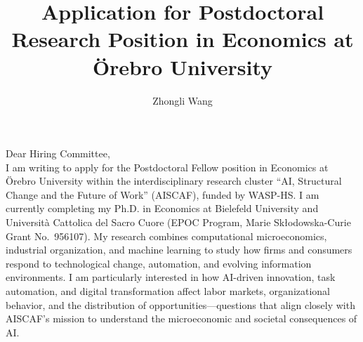 \documentclass{nfr}
\title{Application for Postdoctoral Research Position in Economics at Örebro University}
\author{Zhongli Wang}
\begin{document}

% 
% 
% 
% 


\maketitle


\noindent Dear Hiring Committee,\\[0.2cm]

I am writing to apply for the Postdoctoral Fellow position in Economics at Örebro University within the interdisciplinary research cluster “AI, Structural Change and the Future of Work” (AISCAF), funded by WASP-HS. 
I am currently completing my Ph.D. in Economics at Bielefeld University and Università Cattolica del Sacro Cuore (EPOC Program, Marie Skłodowska-Curie Grant No.~956107). 
My research combines computational microeconomics, industrial organization, and machine learning to study how firms and consumers respond to technological change, automation, and evolving information environments. 
I am particularly interested in how AI-driven innovation, task automation, and digital transformation affect labor markets, organizational behavior, and the distribution of opportunities—questions that align closely with AISCAF’s mission to understand the microeconomic and societal consequences of AI.\\
\end{document}
